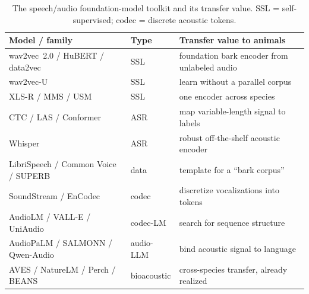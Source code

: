 \begin{table}[htbp]
\centering
\caption{The speech/audio foundation-model toolkit and its transfer value.
SSL = self-supervised; codec = discrete acoustic tokens.}
\label{tab:audio}
\footnotesize
\setlength{\tabcolsep}{4pt}
\begin{tabular}{@{}p{4.6cm}p{1.6cm}p{7.0cm}@{}}
\toprule
\textbf{Model / family} & \textbf{Type} & \textbf{Transfer value to animals} \\
\midrule
wav2vec~2.0 / HuBERT / data2vec~\cite{baevski2020wav2vec2,hsu2021hubert,baevski2022data2vec} & SSL & foundation bark encoder from unlabeled audio \\
wav2vec-U~\cite{baevski2021wav2vecu} & SSL & learn without a parallel corpus \\
XLS-R / MMS / USM~\cite{babu2022xlsr,pratap2023mms,zhang2023usm} & SSL & one encoder across species \\
CTC / LAS / Conformer~\cite{graves2006ctc,chan2016las,gulati2020conformer} & ASR & map variable-length signal to labels \\
Whisper~\cite{radford2023whisper} & ASR & robust off-the-shelf acoustic encoder \\
LibriSpeech / Common Voice / SUPERB~\cite{panayotov2015librispeech,ardila2020commonvoice,yang2021superb} & data & template for a ``bark corpus'' \\
SoundStream / EnCodec~\cite{zeghidour2021soundstream,defossez2022encodec} & codec & discretize vocalizations into tokens \\
AudioLM / VALL-E / UniAudio~\cite{borsos2023audiolm,wang2023valle,yang2024uniaudio} & codec-LM & search for sequence structure \\
AudioPaLM / SALMONN / Qwen-Audio~\cite{rubenstein2023audiopalm,tang2024salmonn,chu2024qwenaudio} & audio-LLM & bind acoustic signal to language \\
AVES / NatureLM / Perch / BEANS~\cite{hagiwara2023aves,robinson2024naturelm,ghani2023perch,hagiwara2023beans} & bioacoustic & cross-species transfer, already realized \\
\bottomrule
\end{tabular}
\end{table}

